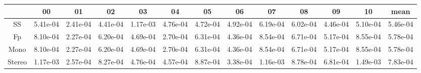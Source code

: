 \begin{tabular}{|c|c|c|c|c|c|c|c|c|c|c|c|c|}
\hline
 & 00 & 01 & 02 & 03 & 04 & 05 & 06 & 07 & 08 & 09 & 10 & mean \\
\hline
SS & 5.41e-04 & 2.41e-04 & 4.41e-04 & 1.17e-03 & 4.76e-04 & 4.72e-04 & 4.92e-04 & 6.19e-04 & 6.02e-04 & 4.46e-04 & 5.10e-04 & 5.46e-04 \\
\hline
Fp & 8.10e-04 & 2.27e-04 & 6.20e-04 & 4.69e-04 & 2.70e-04 & 6.31e-04 & 4.36e-04 & 8.54e-04 & 6.71e-04 & 5.17e-04 & 8.55e-04 & 5.78e-04 \\
\hline
Mono & 8.10e-04 & 2.27e-04 & 6.20e-04 & 4.69e-04 & 2.70e-04 & 6.31e-04 & 4.36e-04 & 8.54e-04 & 6.71e-04 & 5.17e-04 & 8.55e-04 & 5.78e-04 \\
\hline
Stereo & 1.17e-03 & 2.57e-04 & 8.27e-04 & 4.76e-04 & 4.57e-04 & 8.87e-04 & 3.38e-04 & 1.16e-03 & 8.78e-04 & 6.81e-04 & 1.49e-03 & 7.83e-04 \\
\hline
\end{tabular}
